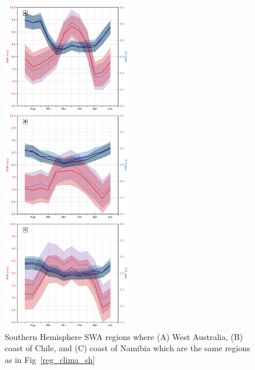 \documentclass[12pt,twoside]{article}
\begin{document}
\begin{figure}[tbh]
\begin{minipage}{.5\textwidth}
  \includegraphics[width=0.5\textwidth]{figs/regional_climatologies/SWARs_reg_clima_4x4_sh_ww3.png}
  \caption{Southern Hemisphere SWA regions where (A) West Australia, (B) coast of Chile, and (C) coast of Namibia which are the same regions as in Fig~\ref{reg_clima_sh}}
  \label{SH_model_comparison}
\end{minipage}
\label{ww3_ifremer_ccmp2_compare}
\end{figure}
\end{document}
